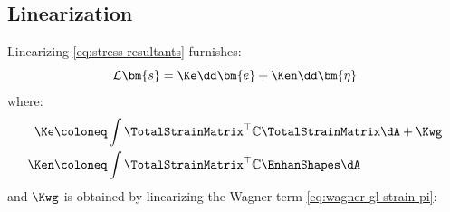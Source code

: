 \subsection{Linearization}

Linearizing \eqref{eq:stress-resultants} furnishes:
\begin{equation}
    \mathcal{L}\bm{s} = \Ke \dd \bm{e} + \Ken \dd \bm{\eta}
\label{eq:Lins}
\end{equation}
where:
\begin{subequations}
\begin{align}
\Ke &\coloneq \int \TotalStrainMatrix^{\top}\mathbb{C}\TotalStrainMatrix \dA  + \Kwg \label{eq:Kee} \\
\Ken &\coloneq \int \TotalStrainMatrix^{\top}\mathbb{C}\EnhanShapes\dA \label{eq:Ken} \\
\end{align}
\end{subequations}
and \(\Kwg\) is obtained by linearizing the Wagner term \eqref{eq:wagner-gl-strain-pi}:
